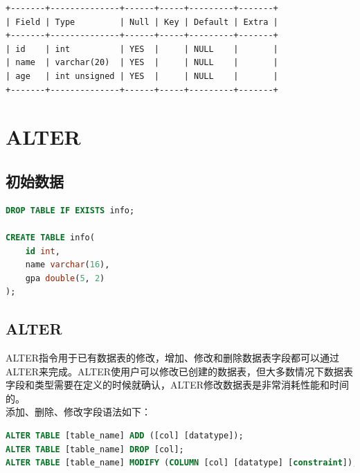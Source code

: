 \documentclass[12pt, openany, oneside]{book}
\begin{document}
\begin{tcolorbox}
\begin{verbatim}
+-------+--------------+------+-----+---------+-------+
| Field | Type         | Null | Key | Default | Extra |
+-------+--------------+------+-----+---------+-------+
| id    | int          | YES  |     | NULL    |       |
| name  | varchar(20)  | YES  |     | NULL    |       |
| age   | int unsigned | YES  |     | NULL    |       |
+-------+--------------+------+-----+---------+-------+
\end{verbatim}
\end{tcolorbox}

\newpage

\chapter{ALTER}

\section{初始数据}


\begin{lstlisting}[language=SQL]
DROP TABLE IF EXISTS info;

CREATE TABLE info(
    id int, 
    name varchar(16), 
    gpa double(5, 2)
);
\end{lstlisting}

\vspace{0.5cm}

\section{ALTER}

ALTER指令用于已有数据表的修改，增加、修改和删除数据表字段都可以通过ALTER来完成。ALTER使用户可以修改已创建的数据表，但大多数情况下数据表字段和类型需要在定义的时候就确认，ALTER修改数据表是非常消耗性能和时间的。\\

添加、删除、修改字段语法如下：

\vspace{-0.5cm}

\begin{lstlisting}[language=SQL]
ALTER TABLE [table_name] ADD ([col] [datatype]);
ALTER TABLE [table_name] DROP [col];
ALTER TABLE [table_name] MODIFY (COLUMN [col] [datatype] [constraint]);
\end{lstlisting}
\end{document}
